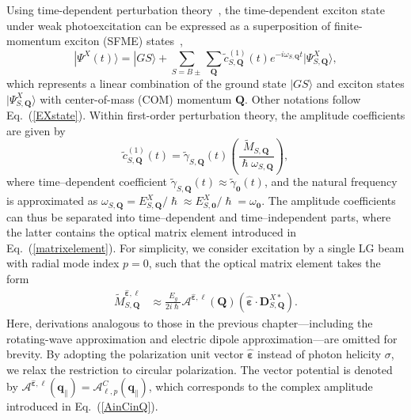 Using time-dependent perturbation theory~\cite{griffiths2018introduction}, the time-dependent exciton state under weak photoexcitation can be expressed as a superposition of finite-momentum exciton (SFME) states~\cite{peng2022tailoring},
\begin{equation}
|\Psi^{X}(t)\rangle
=
|GS\rangle
+
\sum_{S=B\pm}
\sum_{\boldsymbol{Q}}
\tilde{c}^{(1)}_{S,\boldsymbol{Q}}(t)
e^{-i\omega_{S,\boldsymbol{Q}} t}
|\Psi^{X}_{S,\boldsymbol{Q}}\rangle,
\label{exciton_state}
\end{equation}
which represents a linear combination of the ground state $|GS\rangle$ and exciton states $|\Psi^{X}_{S,\boldsymbol{Q}}\rangle$ with center-of-mass (COM) momentum $\boldsymbol{Q}$. Other notations follow Eq.~(\ref{EXstate}). Within first-order perturbation theory, the amplitude coefficients are given by
\[
\tilde{c}^{(1)}_{S,\boldsymbol{Q}}(t)
=
\tilde{\gamma}_{S,\boldsymbol{Q}}(t)
\left(
\frac{\tilde{M}_{S,\boldsymbol{Q}}}{\hslash\omega_{S,\boldsymbol{Q}}}
\right),
\]
where time--dependent coefficient $\tilde{\gamma}_{S,\boldsymbol{Q}}(t)\approx \tilde{\gamma}_{\boldsymbol{0}}(t)$,
and the natural frequency is approximated as
$\omega_{S,\boldsymbol{Q}} = E^{X}_{S,\boldsymbol{Q}}/\hslash \approx E^{X}_{S,\boldsymbol{0}}/\hslash = \omega_{\boldsymbol{0}}$. The amplitude coefficients can thus be separated into time--dependent and time--independent parts, where the latter contains the optical matrix element introduced in Eq.~(\ref{matrixelement}). For simplicity, we consider excitation by a single LG beam with radial mode index $p=0$, such that the optical matrix element takes the form
\begin{align}
\tilde{M}^{\hat{\boldsymbol{\varepsilon}}, \ell}_{S,\boldsymbol{Q}}
&\approx
\frac{E_g}{2i\hslash}
\mathcal{A}^{\hat{\boldsymbol{\varepsilon}},\ell}(\boldsymbol{Q})
\left(
\hat{\boldsymbol{\varepsilon}}
\cdot
\boldsymbol{D}^{X*}_{S,\boldsymbol{Q}}
\right).
\label{matrixelement2}
\end{align}
Here, derivations analogous to those in the previous chapter---including the rotating-wave approximation and electric dipole approximation---are omitted for brevity. By adopting the polarization unit vector $\hat{\boldsymbol{\varepsilon}}$ instead of photon helicity $\sigma$, we relax the restriction to circular polarization. The vector potential is denoted by $\boldsymbol{\mathcal{A}}^{\hat{\boldsymbol{\varepsilon}}, \ell}(\boldsymbol{q}_\parallel)=\boldsymbol{\mathcal{A}}^C_{\ell, p}(\boldsymbol{q}_\parallel)$, which corresponds to the complex amplitude introduced in Eq.~(\ref{AinCinQ}).

